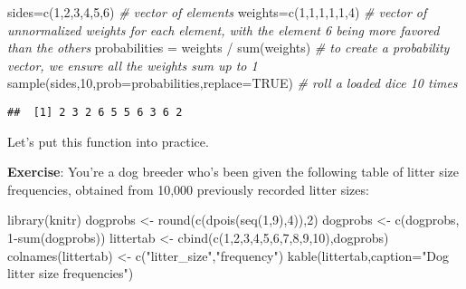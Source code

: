 \documentclass[
]{book}
\newenvironment{Shaded}{\begin{snugshade}}{\end{snugshade}}
\newcommand{\AttributeTok}[1]{\textcolor[rgb]{0.77,0.63,0.00}{#1}}
\newcommand{\CommentTok}[1]{\textcolor[rgb]{0.56,0.35,0.01}{\textit{#1}}}
\newcommand{\ConstantTok}[1]{\textcolor[rgb]{0.00,0.00,0.00}{#1}}
\newcommand{\DecValTok}[1]{\textcolor[rgb]{0.00,0.00,0.81}{#1}}
\newcommand{\FunctionTok}[1]{\textcolor[rgb]{0.00,0.00,0.00}{#1}}
\newcommand{\NormalTok}[1]{#1}
\newcommand{\OtherTok}[1]{\textcolor[rgb]{0.56,0.35,0.01}{#1}}
\newcommand{\SpecialCharTok}[1]{\textcolor[rgb]{0.00,0.00,0.00}{#1}}
\newcommand{\StringTok}[1]{\textcolor[rgb]{0.31,0.60,0.02}{#1}}
\begin{document}
\begin{Shaded}
\begin{Highlighting}[]
\NormalTok{sides}\OtherTok{=}\FunctionTok{c}\NormalTok{(}\DecValTok{1}\NormalTok{,}\DecValTok{2}\NormalTok{,}\DecValTok{3}\NormalTok{,}\DecValTok{4}\NormalTok{,}\DecValTok{5}\NormalTok{,}\DecValTok{6}\NormalTok{) }\CommentTok{\# vector of elements}
\NormalTok{weights}\OtherTok{=}\FunctionTok{c}\NormalTok{(}\DecValTok{1}\NormalTok{,}\DecValTok{1}\NormalTok{,}\DecValTok{1}\NormalTok{,}\DecValTok{1}\NormalTok{,}\DecValTok{1}\NormalTok{,}\DecValTok{4}\NormalTok{) }\CommentTok{\# vector of unnormalized weights for each element, with the element \textquotesingle{}6\textquotesingle{} being more favored than the others}
\NormalTok{probabilities }\OtherTok{=}\NormalTok{ weights }\SpecialCharTok{/} \FunctionTok{sum}\NormalTok{(weights) }\CommentTok{\# to create a probability vector, we ensure all the weights sum up to 1}
\FunctionTok{sample}\NormalTok{(sides,}\DecValTok{10}\NormalTok{,}\AttributeTok{prob=}\NormalTok{probabilities,}\AttributeTok{replace=}\ConstantTok{TRUE}\NormalTok{) }\CommentTok{\# roll a loaded dice 10 times}
\end{Highlighting}
\end{Shaded}

\begin{verbatim}
##  [1] 2 3 2 6 5 5 6 3 6 2
\end{verbatim}

Let's put this function into practice.

\textbf{Exercise}: You're a dog breeder who's been given the following table of litter size frequencies, obtained from 10,000 previously recorded litter sizes:

\begin{Shaded}
\begin{Highlighting}[]
\FunctionTok{library}\NormalTok{(knitr)}
\NormalTok{dogprobs }\OtherTok{\textless{}{-}} \FunctionTok{round}\NormalTok{(}\FunctionTok{c}\NormalTok{(}\FunctionTok{dpois}\NormalTok{(}\FunctionTok{seq}\NormalTok{(}\DecValTok{1}\NormalTok{,}\DecValTok{9}\NormalTok{),}\DecValTok{4}\NormalTok{)),}\DecValTok{2}\NormalTok{)}
\NormalTok{dogprobs }\OtherTok{\textless{}{-}} \FunctionTok{c}\NormalTok{(dogprobs, }\DecValTok{1}\SpecialCharTok{{-}}\FunctionTok{sum}\NormalTok{(dogprobs))}
\NormalTok{littertab }\OtherTok{\textless{}{-}} \FunctionTok{cbind}\NormalTok{(}\FunctionTok{c}\NormalTok{(}\DecValTok{1}\NormalTok{,}\DecValTok{2}\NormalTok{,}\DecValTok{3}\NormalTok{,}\DecValTok{4}\NormalTok{,}\DecValTok{5}\NormalTok{,}\DecValTok{6}\NormalTok{,}\DecValTok{7}\NormalTok{,}\DecValTok{8}\NormalTok{,}\DecValTok{9}\NormalTok{,}\DecValTok{10}\NormalTok{),dogprobs)}
\FunctionTok{colnames}\NormalTok{(littertab) }\OtherTok{\textless{}{-}} \FunctionTok{c}\NormalTok{(}\StringTok{"litter\_size"}\NormalTok{,}\StringTok{"frequency"}\NormalTok{)}
\FunctionTok{kable}\NormalTok{(littertab,}\AttributeTok{caption=}\StringTok{"Dog litter size frequencies"}\NormalTok{)}
\end{Highlighting}
\end{Shaded}
\end{document}
